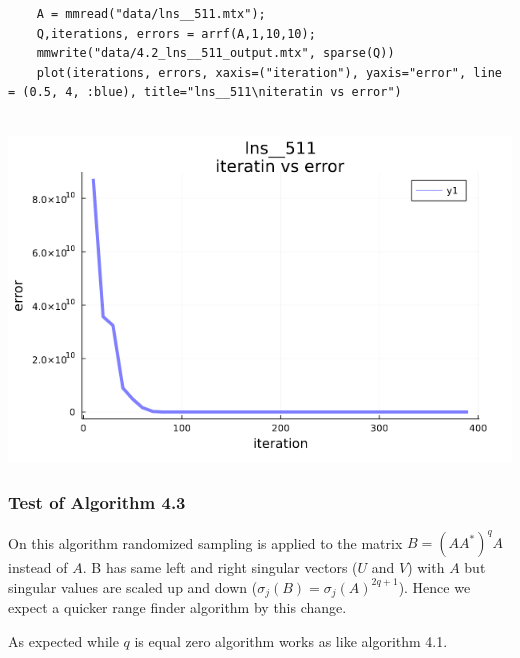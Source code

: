 \documentclass[11pt,a4paper]{article}
\theoremstyle{definition}
\begin{document}
	\begin{lstlisting}
	A = mmread("data/lns__511.mtx");
	Q,iterations, errors = arrf(A,1,10,10);
	mmwrite("data/4.2_lns__511_output.mtx", sparse(Q))
	plot(iterations, errors, xaxis=("iteration"), yaxis="error", line = (0.5, 4, :blue), title="lns__511\niteratin vs error")


	\end{lstlisting}
	\includegraphics[scale=0.5]{images/4.2_4.png}

	\subsubsection{Test of Algorithm 4.3}
	On this algorithm randomized sampling is applied to the matrix $B = (AA^*)^qA$ instead of $A$. B has same left and right singular vectors ($U$ and $V$) with $A$ but singular values are scaled up and down ($\sigma_j(B) = \sigma_j(A)^{2q+1}$). Hence we expect a quicker range finder algorithm by this change.

	As expected while $q$ is equal zero algorithm works as like algorithm 4.1.
\end{document}
